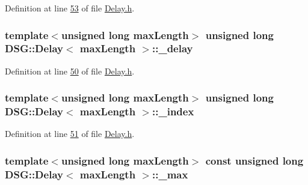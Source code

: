 Definition at line \hyperlink{_delay_8h_source_l00053}{53} of file \hyperlink{_delay_8h_source}{Delay.\+h}.

\hypertarget{class_d_s_g_1_1_delay_aad8790118689ae46c7f434b790358e3f}{
\subsubsection[{\+\_\+delay}]{\setlength{\rightskip}{0pt plus 5cm}template$<$unsigned long max\+Length$>$ unsigned long {\bf D\+S\+G\+::\+Delay}$<$ max\+Length $>$\+::\+\_\+delay\hspace{0.3cm}{\ttfamily [protected]}}}\label{class_d_s_g_1_1_delay_aad8790118689ae46c7f434b790358e3f}


Definition at line \hyperlink{_delay_8h_source_l00050}{50} of file \hyperlink{_delay_8h_source}{Delay.\+h}.

\hypertarget{class_d_s_g_1_1_delay_ac39e72226786a3c43b231b69752431ec}{
\subsubsection[{\+\_\+index}]{\setlength{\rightskip}{0pt plus 5cm}template$<$unsigned long max\+Length$>$ unsigned long {\bf D\+S\+G\+::\+Delay}$<$ max\+Length $>$\+::\+\_\+index\hspace{0.3cm}{\ttfamily [protected]}}}\label{class_d_s_g_1_1_delay_ac39e72226786a3c43b231b69752431ec}


Definition at line \hyperlink{_delay_8h_source_l00051}{51} of file \hyperlink{_delay_8h_source}{Delay.\+h}.

\hypertarget{class_d_s_g_1_1_delay_a1751998677ff85f6580c383e17347d9c}{
\subsubsection[{\+\_\+max}]{\setlength{\rightskip}{0pt plus 5cm}template$<$unsigned long max\+Length$>$ const unsigned long {\bf D\+S\+G\+::\+Delay}$<$ max\+Length $>$\+::\+\_\+max\hspace{0.3cm}{\ttfamily [protected]}}}\label{class_d_s_g_1_1_delay_a1751998677ff85f6580c383e17347d9c}


